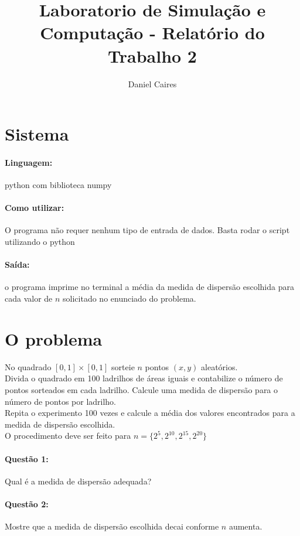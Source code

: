\documentclass[a4paper,12pt]{article}
\title{Laboratorio de Simulação e Computação - Relatório do Trabalho 2}
\author{Daniel Caires}
\date{}
\begin{document}
\maketitle
	\section{Sistema}
		\paragraph{Linguagem:} python com biblioteca numpy
		\paragraph{Como utilizar:} O programa não requer nenhum tipo de entrada de dados. Basta rodar o script utilizando o python
		\paragraph{Saída:} o programa imprime no terminal a média da medida de dispersão escolhida para cada valor de $n$ solicitado no enunciado do problema.

	\section{O problema}
		No quadrado $[0,1]\times[0,1]$ sorteie $n$ pontos $(x,y)$ aleatórios. \\
		Divida o quadrado em 100 ladrilhos de áreas iguais e contabilize o número de pontos sorteados em cada ladrilho. Calcule uma medida de dispersão para o número de pontos por ladrilho.\\ %
		Repita o experimento 100 vezes e calcule a média dos valores encontrados para a medida de dispersão escolhida.\\
		O procedimento deve ser feito para $n=\{2^5,2^{10},2^{15},2^{20}\}$\\
		\paragraph{Questão 1:} Qual é a medida de dispersão adequada?\\
		\paragraph{Questão 2:} Mostre que a medida de dispersão escolhida decai conforme $n$ aumenta.
\end{document}
